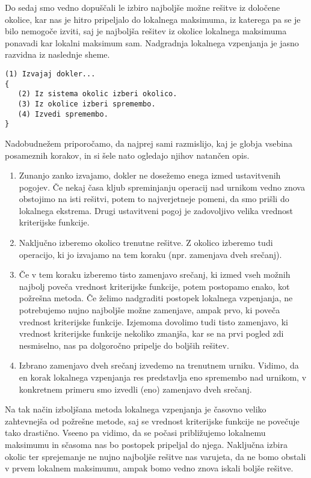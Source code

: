 \documentclass[a4paper,10pt]{article}
\begin{document}
Do sedaj smo vedno dopuščali le izbiro najboljše možne rešitve iz določene okolice, kar nas
je hitro pripeljalo do lokalnega maksimuma, iz katerega pa se je bilo nemogoče izviti, saj
je najboljša rešitev iz okolice lokalnega maksimuma ponavadi kar lokalni maksimum sam.
Nadgradnja lokalnega vzpenjanja je jasno razvidna iz naslednje sheme.
\begin{verbatim}
(1) Izvajaj dokler...
{
   (2) Iz sistema okolic izberi okolico.
   (3) Iz okolice izberi spremembo.
   (4) Izvedi spremembo.
}
\end{verbatim}
Nadobudnežem priporočamo, da najprej sami razmislijo, kaj je globja vsebina posameznih
korakov, in si šele nato ogledajo njihov natančen opis.
\begin{enumerate}
\item Zunanjo zanko izvajamo, dokler ne dosežemo enega izmed ustavitvenih pogojev.
Če nekaj časa kljub spreminjanju operacij nad urnikom vedno znova obstojimo na isti
rešitvi, potem to najverjetneje pomeni, da smo prišli do lokalnega ekstrema. Drugi
ustavitveni pogoj je zadovoljivo velika vrednost kriterijske funkcije.

\item Naključno izberemo okolico trenutne rešitve. Z okolico izberemo tudi operacijo,
ki jo izvajamo na tem koraku (npr. zamenjava dveh srečanj).

\item Če v tem koraku izberemo tisto zamenjavo srečanj, ki izmed vseh možnih najbolj
poveča vrednost kriterijske funkcije, potem postopamo enako, kot požrešna metoda. Če
želimo nadgraditi postopek lokalnega vzpenjanja, ne potrebujemo nujno najboljše možne
zamenjave, ampak prvo, ki poveča vrednost kriterijske funkcije. Izjemoma dovolimo tudi
tisto zamenjavo, ki vrednost kriterijske funkcije nekoliko zmanjša, kar se na prvi
pogled zdi nesmiselno, nas pa dolgoročno pripelje do boljših rešitev.

\item Izbrano zamenjavo dveh srečanj izvedemo na trenutnem urniku. Vidimo, da en korak
lokalnega vzpenjanja res predstavlja eno spremembo nad urnikom, v konkretnem primeru
smo izvedli (eno) zamenjavo dveh srečanj.
\end{enumerate}
Na tak način izboljšana metoda lokalnega vzpenjanja je časovno veliko zahtevnejša od
požrešne metode, saj se vrednost kriterijske funkcije ne povečuje tako drastično. Vseeno
pa vidimo, da se počasi približujemo lokalnemu maksimumu in sčasoma nas bo postopek
pripeljal do njega. Naključna izbira okolic ter sprejemanje ne nujno najboljše rešitve
nas varujeta, da ne bomo obstali v prvem lokalnem maksimumu, ampak bomo vedno znova
iskali boljše rešitve.
\end{document}
